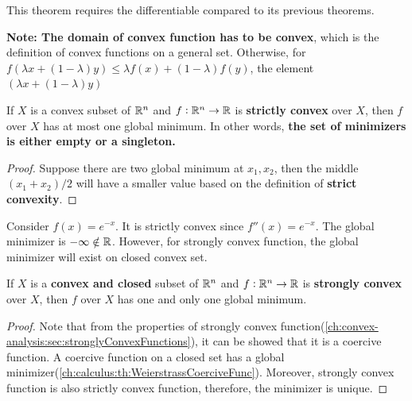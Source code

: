 \begin{refsection}
\begin{remark}
This theorem requires the differentiable compared to its previous theorems.
\end{remark}

\begin{mdframed}
\textbf{Note: The domain of convex function has to be convex}, which is the definition of convex functions on a general set. Otherwise, for  $f(\lambda x + (1 - \lambda)y) \leq \lambda f(x) + (1-\lambda)f(y)$, the element $(\lambda x + (1-\lambda) y)$
\end{mdframed}

\begin{lemma}\label{ch:convex-optimization:th:uniqueglobalminimumUnderStrictConvexity}\cite[17]{bertsekas2016nonlinear}
If $X$ is a convex subset of $\mathbb{R}^n$ and $f:\mathbb{R}^n\to \mathbb{R}$ is \textbf{strictly convex} over $X$, then $f$ over $X$ has at most one global minimum. In other words, \textbf{the set of minimizers is either empty or a singleton.}
\end{lemma}
\begin{proof}
Suppose there are two global minimum at $x_1,x_2$, then the middle $(x_1+x_2)/2$ will have a smaller value based on the definition of \textbf{strict convexity}.
\end{proof}

\begin{remark}
Consider $f(x) = e^{-x}$. It is strictly convex since $f''(x) = e^{-x}$. The global minimizer is $-\infty \notin \mathbb{R}$. However, for strongly convex function, the global minimizer will exist on closed convex set.
\end{remark}


\begin{lemma}\label{ch:convex-optimization:th:existenceUniqueglobalminimumUnderStrongConvexity}\cite[17]{bertsekas2016nonlinear}
	If $X$ is a \textbf{ convex and closed} subset of $\mathbb{R}^n$ and $f:\mathbb{R}^n\to \mathbb{R}$ is \textbf{strongly convex} over $X$, then $f$ over $X$ has one and only one global minimum. 
\end{lemma}
\begin{proof}
Note that from the properties of strongly convex function(\autoref{ch:convex-analysis:sec:stronglyConvexFunctions}), it can be showed that it is a coercive function. A coercive function on a closed set has a global minimizer(\autoref{ch:calculus:th:WeierstrassCoerciveFunc}). Moreover, strongly convex function is also strictly convex function, therefore, the minimizer is unique.
\end{proof}




\end{refsection}
